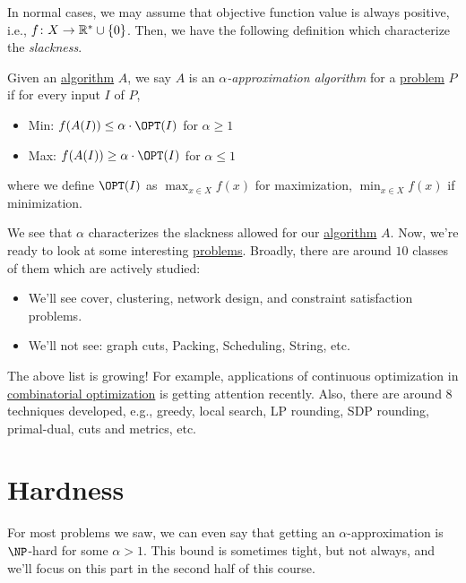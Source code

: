 In normal cases, we may assume that objective function value is always positive, i.e., \(f\colon X \to \mathbb{\MakeUppercase{r}} ^* \cup \left\{ 0 \right\} \). Then, we have the following definition which characterize the \emph{slackness}.

\begin{definition}\label{def:approximation-algorithm}
	Given an \hyperref[def:algorithm]{algorithm} \(A\), we say \(A\) is an \emph{\(\alpha\)-approximation algorithm} for a \hyperref[def:computational-problem]{problem} \(P\) if for every input \(I\) of \(P\),
	\begin{itemize}
		\item Min: \(f(A(I)) \leq \alpha \cdot \OPT (I)\) for \(\alpha \geq 1\)
		\item Max: \(f(A(I)) \geq \alpha \cdot \OPT (I)\) for \(\alpha \leq 1\)
	\end{itemize}
	where we define \(\OPT(I)\) as \(\max _{x\in X}f(x)\) for maximization, \(\min _{x\in X}f(x)\) if minimization.
\end{definition}

We see that \(\alpha \) characterizes the slackness allowed for our \hyperref[def:algorithm]{algorithm} \(A\). Now, we're ready to look at some interesting \hyperref[def:combinatorial-optimization]{problems}. Broadly, there are around \(10\) classes of them which are actively studied:

\begin{itemize}
	\item We'll see cover, clustering, network design, and constraint satisfaction problems.
	\item We'll not see: graph cuts, Packing, Scheduling, String, etc.
\end{itemize}

The above list is growing! For example, applications of continuous optimization in \hyperref[def:combinatorial-optimization]{combinatorial optimization} is getting attention recently. Also, there are around \(8\) techniques developed, e.g., greedy, local search, LP rounding, SDP rounding, primal-dual, cuts and metrics, etc.

\section{Hardness}

For most problems we saw, we can even say that getting an \(\alpha\)-approximation is \(\NP\)-hard for some \(\alpha > 1\). This bound is sometimes tight, but not always, and we'll focus on this part in the second half of this course.

